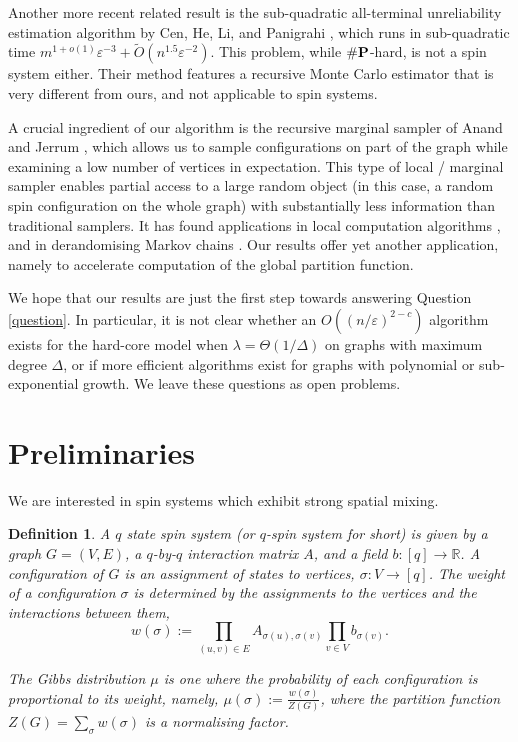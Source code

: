 \documentclass[10pt,a4paper]{article}
\newtheorem{definition}{Definition}[section]
\newcommand{\htodo}[1]{\todo[color=green!30]{Heng: #1}}
\newcommand{\eps}{\varepsilon}
\newcommand{\defeq}{:=}
\newcommand{\numP}{\#{\textnormal{\textbf{P}}}}
\begin{document}
Another more recent related result is the sub-quadratic all-terminal unreliability estimation algorithm by Cen, He, Li, and Panigrahi \cite{CHLP23},
which runs in sub-quadratic time $m^{1+o(1)}\eps^{-3}+\widetilde{O}(n^{1.5}\eps^{-2})$.
This problem, while $\numP$-hard, is not a spin system either.
Their method features a recursive Monte Carlo estimator that is very different from ours,
and not applicable to spin systems.

A crucial ingredient of our algorithm is the recursive marginal sampler of Anand and Jerrum \cite{AJ22}, which allows us to sample configurations on part of the graph while examining a low number of vertices in expectation.
This type of local / marginal sampler enables partial access to a large random object (in this case, a random spin configuration on the whole graph) with substantially less information than traditional samplers.
It has found applications in local computation algorithms \cite{BRY20}, and in derandomising Markov chains \cite{FGWWY22}.
Our results offer yet another application, namely to accelerate computation of the global partition function. 

We hope that our results are just the first step towards answering Question \eqref{question}.
In particular, it is not clear whether an $O((n/\eps)^{2-c})$ algorithm exists for the hard-core model when $\lambda=\Theta(1/\Delta)$ on graphs with maximum degree $\Delta$,
or if more efficient algorithms exist for graphs with polynomial or sub-exponential growth.
We leave these questions as open problems.

\section{Preliminaries}\label{sec:prelim}
We are interested in spin systems which exhibit strong spatial mixing. 

\begin{definition}
  A $q$ state spin system (or $q$-spin system for short) is given by a graph $G=(V,E)$, a $q$-by-$q$ interaction matrix $A$, and a field $b:[q]\rightarrow\mathbb{R}$. A configuration of $G$ is an assignment of states to vertices, $\sigma: V\rightarrow[q]$. The weight of a configuration $\sigma$ is determined by the assignments to the vertices and the interactions between them,
\[w(\sigma)\defeq\prod_{(u,v)\in E}A_{\sigma(u),\sigma(v)}\prod_{v\in V}b_{\sigma(v)}.\]

The Gibbs distribution $\mu$ is one where the probability of each configuration is proportional to its weight, namely, $\mu(\sigma)\defeq\frac{w(\sigma)}{Z(G)}$, where the partition function $Z(G)=\sum_\sigma w(\sigma)$ is a normalising factor. 
\end{definition}
\end{document}
